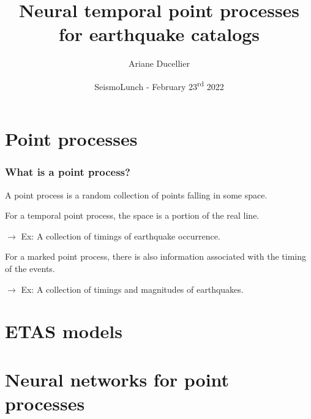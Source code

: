 \documentclass{beamer}
\title[Neural temporal point processes for earthquake catalogs]{Neural temporal point processes for earthquake catalogs}
\author{Ariane Ducellier}
\institute{University of Washington}
\date{SeismoLunch - February 23\textsuperscript{rd} 2022}
\begin{document}
	\begin{frame}
		\titlepage
	\end{frame}

	\section{Point processes}

	\begin{frame}
		\frametitle{What is a point process?}
		A point process is a random collection of points falling in some space.

		\vspace{1em}

		For a temporal point process, the space is a portion of the real line.

		\vspace{1em}

		$\rightarrow$ Ex: A collection of timings of earthquake occurrence.

		\vspace{2em}

		For a marked point process, there is also information associated with the timing of the events.

		\vspace{1em}

		$\rightarrow$ Ex: A collection of timings and magnitudes of earthquakes.
	\end{frame}

	\section{ETAS models}

	\section{Neural networks for point processes}
\end{document}

